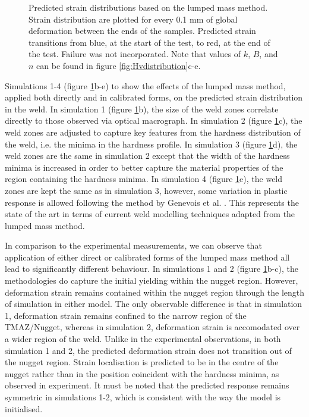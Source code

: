 \begin{figure}[h!t]
	\caption[Strain predictions based on lumped mass method]{Predicted strain distributions based on the lumped mass method. Strain distribution are plotted for every 0.1 mm of global deformation between the ends of the samples. Predicted strain transitions from blue, at the start of the test, to red, at the end of the test. Failure was not incorporated. Note that values of $k$, $B$, and $n$ can be found in figure \ref{fig:Hvdistribution}c-e.}
	\label{fig:LumpedMassPredictions}
\end{figure}

Simulations 1-4 (figure \ref{fig:LumpedMassPredictions}b-e) to show the effects of the lumped mass method, applied both directly and in calibrated forms, on the predicted strain distribution in the weld. In simulation 1 (figure \ref{fig:LumpedMassPredictions}b), the size of the weld zones correlate directly to those observed via optical macrograph. In simulation 2 (figure \ref{fig:LumpedMassPredictions}c), the weld zones are adjusted to capture key features from the hardness distribution of the weld, i.e. the minima in the hardness profile. In simulation 3 (figure \ref{fig:LumpedMassPredictions}d), the weld zones are the same in simulation 2 except that the width of the hardness minima is increased in order to better capture the material properties of the region containing the hardness minima. In simulation 4 (figure \ref{fig:LumpedMassPredictions}e), the weld zones are kept the same as in simulation 3, however, some variation in plastic response is allowed following the method by Genevois et al. \cite{Genevois2006}. This represents the state of the art in terms of current weld modelling techniques adapted from the lumped mass method. 

In comparison to the experimental measurements, we can observe that application of either direct or calibrated forms of the lumped mass method all lead to significantly different behaviour. In simulations 1 and 2 (figure \ref{fig:LumpedMassPredictions}b-c), the methodologies do capture the initial yielding within the nugget region. However, deformation strain remains contained within the nugget region through the length of simulation in either model. The only observable difference is that in simulation 1, deformation strain remains confined to the narrow region of the TMAZ/Nugget, whereas in simulation 2, deformation strain is accomodated over a wider region of the weld. Unlike in the experimental observations, in both simulation 1 and 2, the predicted deformation strain does not transition out of the nugget region. Strain localisation is predicted to be in the centre of the nugget rather than in the position coincident with the hardness minima, as observed in experiment. It must be noted that the predicted response remains symmetric in simulations 1-2, which is consistent with the way the model is initialised. 

